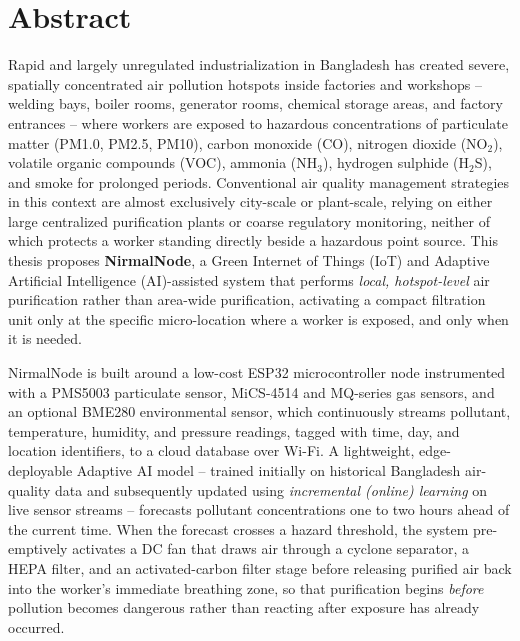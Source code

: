 \chapter*{Abstract}

Rapid and largely unregulated industrialization in Bangladesh has created severe, spatially concentrated air pollution hotspots inside factories and workshops -- welding bays, boiler rooms, generator rooms, chemical storage areas, and factory entrances -- where workers are exposed to hazardous concentrations of particulate matter (PM1.0, PM2.5, PM10), carbon monoxide (CO), nitrogen dioxide (NO$_2$), volatile organic compounds (VOC), ammonia (NH$_3$), hydrogen sulphide (H$_2$S), and smoke for prolonged periods. Conventional air quality management strategies in this context are almost exclusively city-scale or plant-scale, relying on either large centralized purification plants or coarse regulatory monitoring, neither of which protects a worker standing directly beside a hazardous point source. This thesis proposes \textbf{NirmalNode}, a Green Internet of Things (IoT) and Adaptive Artificial Intelligence (AI)-assisted system that performs \emph{local, hotspot-level} air purification rather than area-wide purification, activating a compact filtration unit only at the specific micro-location where a worker is exposed, and only when it is needed.

NirmalNode is built around a low-cost ESP32 microcontroller node instrumented with a PMS5003 particulate sensor, MiCS-4514 and MQ-series gas sensors, and an optional BME280 environmental sensor, which continuously streams pollutant, temperature, humidity, and pressure readings, tagged with time, day, and location identifiers, to a cloud database over Wi-Fi. A lightweight, edge-deployable Adaptive AI model -- trained initially on historical Bangladesh air-quality data and subsequently updated using \emph{incremental (online) learning} on live sensor streams -- forecasts pollutant concentrations one to two hours ahead of the current time. When the forecast crosses a hazard threshold, the system pre-emptively activates a DC fan that draws air through a cyclone separator, a HEPA filter, and an activated-carbon filter stage before releasing purified air back into the worker's immediate breathing zone, so that purification begins \emph{before} pollution becomes dangerous rather than reacting after exposure has already occurred.

